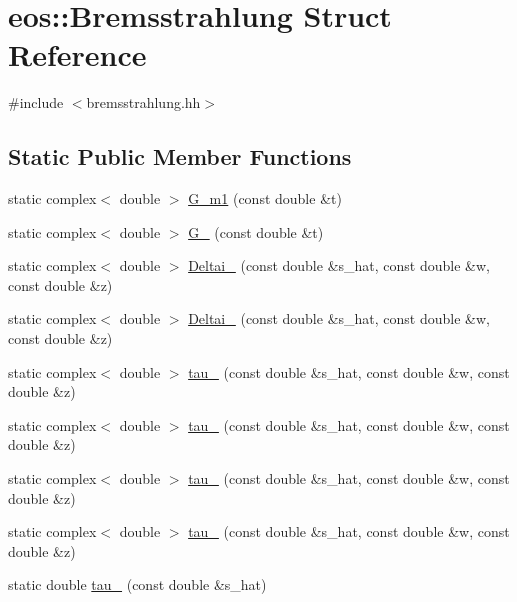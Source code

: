 \hypertarget{structeos_1_1Bremsstrahlung}{
\section{eos::Bremsstrahlung Struct Reference}
\label{structeos_1_1Bremsstrahlung}
}


{\ttfamily \#include $<$bremsstrahlung.hh$>$}\subsection*{Static Public Member Functions}
\begin{DoxyCompactItemize}
\item 
static complex$<$ double $>$ \hyperlink{structeos_1_1Bremsstrahlung_af39debb09760b0c3b6983ac6d7e28d05}{G\_\-m1} (const double \&t)
\item 
static complex$<$ double $>$ \hyperlink{structeos_1_1Bremsstrahlung_a6a5cd1999022a000279e9f7f49d094ea}{G\_} (const double \&t)
\item 
static complex$<$ double $>$ \hyperlink{structeos_1_1Bremsstrahlung_a321b14e0b15b3792e25febebf9265c78}{Deltai\_} (const double \&s\_\-hat, const double \&w, const double \&z)
\item 
static complex$<$ double $>$ \hyperlink{structeos_1_1Bremsstrahlung_aa39b222255a5519ba2488e4e21562008}{Deltai\_} (const double \&s\_\-hat, const double \&w, const double \&z)
\item 
static complex$<$ double $>$ \hyperlink{structeos_1_1Bremsstrahlung_a544c157bc4ac9251fd2aa8987bb0459d}{tau\_} (const double \&s\_\-hat, const double \&w, const double \&z)
\item 
static complex$<$ double $>$ \hyperlink{structeos_1_1Bremsstrahlung_a1e48477fa9e8b56fe4e508590ad21bd3}{tau\_} (const double \&s\_\-hat, const double \&w, const double \&z)
\item 
static complex$<$ double $>$ \hyperlink{structeos_1_1Bremsstrahlung_ae1e1543d756fa96dd3f82645412babb8}{tau\_} (const double \&s\_\-hat, const double \&w, const double \&z)
\item 
static complex$<$ double $>$ \hyperlink{structeos_1_1Bremsstrahlung_a51142a21972c592612539cf4bd35cafb}{tau\_} (const double \&s\_\-hat, const double \&w, const double \&z)
\item 
static double \hyperlink{structeos_1_1Bremsstrahlung_a708d1b79eb63945e3598f1c8f8bc07dc}{tau\_} (const double \&s\_\-hat)
\item 

\end{DoxyCompactItemize}
